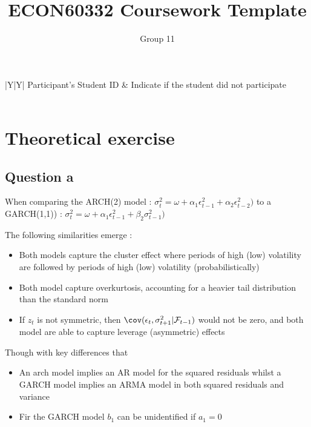 \documentclass{article}
\title{ECON60332 Coursework Template}
\author{Group 11} %
\date{}
\begin{document}
\maketitle

\noindent\begin{tabularx}{\linewidth}{|Y|Y|}
    \hline
     Participant’s Student ID & Indicate if the student did not participate \\
    \hline
    \\
    \hline

\end{tabularx}

\section*{Theoretical exercise}

\subsection*{Question a}

When comparing the ARCH(2) model : $\sigma^2_{t} = \omega + \alpha_1 \epsilon_{t-1}^2 + \alpha_2 \epsilon^2_{t-2})$ to a GARCH(1,1)) : $\sigma^2_{t} = \omega + \alpha_1 \epsilon_{t-1}^2 + \beta_2 \sigma^2_{t-1})$

The following similarities emerge :
\begin{itemize}
	\item Both models capture the cluster effect where periods of high (low) volatility are followed by periods of high (low) volatility (probabilistically) 
		\item Both model capture overkurtosis, accounting for a heavier tail distribution than the standard norm
		\item If $z_{t}$ is not symmetric, then $\cov(\epsilon_t, \sigma^2_{t+1} | \ensuremath{\mathcal{F}}_{t-1})$ would not be zero, and both model are able to capture leverage (asymmetric) effects 
\end{itemize}

Though with key differences that
\begin{itemize}
	\item An arch model implies an AR model for the squared residuals whilst a GARCH model implies an ARMA model in both squared residuals and variance
	\item Fir the GARCH model $b_1$ can be unidentified if $a_1=0$
\end{itemize}
\end{document}
